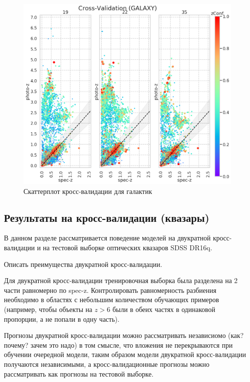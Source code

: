 \documentclass[fleqn,usenatbib]{mnras}
\begin{document}

\begin{figure}
    \centering
    \includegraphics[width=0.9\linewidth]{images/scatterplots-cv2-gal.png}
    \caption{Скаттерплот кросс-валидации для галактик}
    \label{fig:metrics-cv2-qso}
\end{figure}

\subsection{Результаты на кросс-валидации (квазары)}
В данном разделе рассматривается поведение моделей на двукратной кросс-валидации и на тестовой выборке оптических квазаров SDSS DR16q.

Описать преимущества двукратной кросс-валидации.

Для двукратной кросс-валидации тренировочная выборка была разделена на 2 части равномерно по spec-z. Контролировать равномерность разбиения необходимо в областях с небольшим количеством обучающих примеров (например, чтобы объекты на $z > 6$ были в обеих частях в одинаковой пропорции, а не попали в одну часть).

Прогнозы двукратной кросс-валидации можно рассматривать независиомо (как? почему? зачем это надо) в том смысле, что вложения не перекрываются при обучении очередной модели, таким образом модели двукратной кросс-валидации получаются независимыми, а кросс-валидационные прогнозы можно рассматривать как прогнозы на тестовой выборке.
\end{document}
